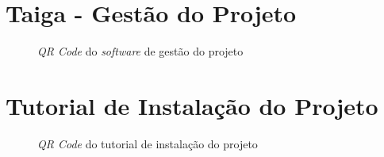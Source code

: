 \section*{Taiga - Gestão do Projeto}
\begin{figure}[h]
	\centering
		\caption{\emph{QR Code} do \emph{software} de gestão do projeto}
		\label{fig:qrcode-taiga}
\end{figure}

\section*{Tutorial de Instalação do Projeto}
\begin{figure}[h]
	\centering
	\caption{\emph{QR Code} do tutorial de instalação do projeto}
	\label{fig:qrcode-instalacao}
\end{figure}